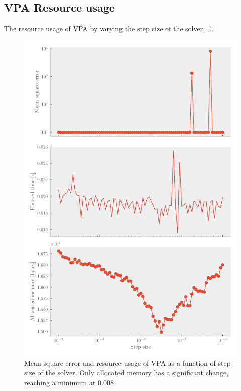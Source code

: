 \begin{appendices}
  \section{VPA Resource usage}
  The resource usage of VPA by varying the step size of the solver,~\cref{fig:vpa_measurements}.
\begin{figure}[p]
  \centering
  \includegraphics[]{Figures/vpa_measurements.pdf}
  \caption{\label{fig:vpa_measurements} Mean square error and resource usage of
    VPA as a function of step size of the solver. Only allocated memory has a
    significant change, reaching a minimum at \(0.008\)}
\end{figure}



\end{appendices}